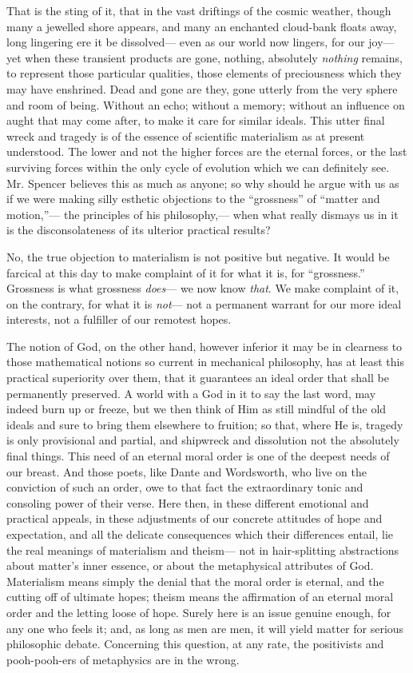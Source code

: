 \documentclass[12pt]{article}
\begin{document}
That is the sting of it, that in the vast driftings of the cosmic weather, though many a jewelled shore appears, and many an enchanted cloud-bank floats away, long lingering ere it be dissolved--- even as our world now lingers, for our joy--- yet when these transient products are gone, nothing, absolutely \emph{nothing} remains, to represent those particular qualities, those elements of preciousness which they may have enshrined. Dead and gone are they, gone utterly from the very sphere and room of being. Without an echo; without a memory; without an influence on aught that may come after, to make it care for similar ideals. This utter final wreck and tragedy is of the essence of scientific materialism as at present understood. The lower and not the higher forces are the eternal forces, or the last surviving forces within the only cycle of evolution which we can definitely see. Mr. Spencer believes this as much as anyone; so why should he argue with us as if we were making silly esthetic objections to the ``grossness'' of ``matter and motion,''--- the principles of his philosophy,--- when what really dismays us in it is the disconsolateness of its ulterior practical results? 

No, the true objection to materialism is not positive but negative. It would be farcical at this day to make complaint of it for what it is, for ``grossness.'' Grossness is what grossness \emph{does}--- we now know \emph{that}. We make complaint of it, on the contrary, for what it is \emph{not}--- not a permanent warrant for our more ideal interests, not a fulfiller of our remotest hopes. 

The notion of God, on the other hand, however inferior it may be in clearness to those mathematical notions so current in mechanical philosophy, has at least this practical superiority over them, that it guarantees an ideal order that shall be permanently preserved. A world with a God in it to say the last word, may indeed burn up or freeze, but we then think of Him as still mindful of the old ideals and sure to bring them elsewhere to fruition; so that, where He is, tragedy is only provisional and partial, and shipwreck and dissolution not the absolutely final things. This need of an eternal moral order is one of the deepest needs of our breast. And those poets, like Dante and Wordsworth, who live on the conviction of such an order, owe to that fact the extraordinary tonic and consoling power of their verse. Here then, in these different emotional and practical appeals, in these adjustments of our concrete attitudes of hope and expectation, and all the delicate consequences which their differences entail, lie the real meanings of materialism and theism--- not in hair-splitting abstractions about matter's inner essence, or about the metaphysical attributes of God. Materialism means simply the denial that the moral order is eternal, and the cutting off of ultimate hopes; theism means the affirmation of an eternal moral order and the letting loose of hope. Surely here is an issue genuine enough, for any one who feels it; and, as long as men are men, it will yield matter for serious philosophic debate. Concerning this question, at any rate, the positivists and pooh-pooh-ers of metaphysics are in the wrong. 
\end{document}
